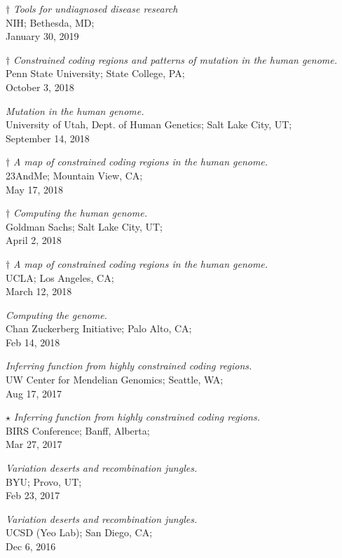 \documentclass[margin,line]{cv}
\begin{document}
\begin{resume}
    $\dagger$ \textit{Tools for undiagnosed disease research} \\
    NIH; Bethesda, MD; \\
    January 30, 2019

    $\dagger$ \textit{Constrained coding regions and patterns of mutation in the human genome.
} \\
    Penn State University; State College, PA; \\
    October 3, 2018

    \textit{Mutation in the human genome.
} \\
    University of Utah, Dept. of Human Genetics; Salt Lake City, UT; \\
    September 14, 2018

    $\dagger$ \textit{A map of constrained coding regions in the human genome.
} \\
    23AndMe; Mountain View, CA; \\
    May 17, 2018

    $\dagger$ \textit{Computing the human genome.
} \\
    Goldman Sachs; Salt Lake City, UT; \\
    April 2, 2018

    $\dagger$ \textit{A map of constrained coding regions in the human genome.
} \\
    UCLA; Los Angeles, CA; \\
    March 12, 2018

    \textit{Computing the genome.} \\
    Chan Zuckerberg Initiative; Palo Alto, CA; \\
    Feb 14, 2018

    \textit{Inferring function from highly constrained coding regions.} \\
    UW Center for Mendelian Genomics; Seattle, WA; \\
    Aug 17, 2017

    $\star$ \textit{Inferring function from highly constrained coding regions.} \\
    BIRS Conference; Banff, Alberta; \\
    Mar 27, 2017

    \textit{Variation deserts and recombination jungles.} \\
    BYU; Provo, UT; \\
    Feb 23, 2017

    \textit{Variation deserts and recombination jungles.} \\
    UCSD (Yeo Lab); San Diego, CA; \\
    Dec 6, 2016


\end{resume}
\end{document}
